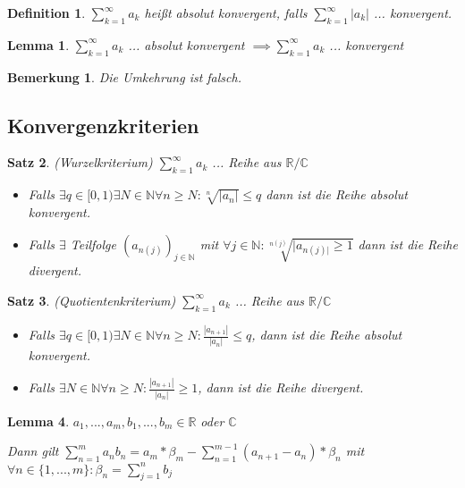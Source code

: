 \documentclass[twocolumn]{article}
\newtheorem{theorem}{Satz}[section]
\newtheorem{lemma}[theorem]{Lemma}
\newtheorem{definition}{Definition}[section]
\newtheorem*{remark}{Bemerkung}
\begin{document}
\begin{definition}
	$\sum_{k=1}^{\infty}a_k$ heißt absolut konvergent, falls $\sum_{k=1}^{\infty}|a_k|$ ... konvergent.
\end{definition}

\begin{lemma}
	$\sum_{k=1}^{\infty}a_k$ ... absolut konvergent $\implies \sum_{k=1}^{\infty}a_k$ ... konvergent
\end{lemma}

\begin{remark}
	Die Umkehrung ist falsch.
\end{remark}

\subsection{Konvergenzkriterien}

\begin{theorem}(Wurzelkriterium)
	$\sum_{k=1}^{\infty}a_k$ ... Reihe aus $\mathbb{R} / \mathbb{C}$
	
	\begin{itemize}
		\item Falls $\exists q \in [0,1) \exists N \in \mathbb{N} \forall n \geq N : \sqrt[n]{|a_n|}\leq q$ dann ist die Reihe absolut konvergent.
		\item Falls $\exists$ Teilfolge $(a_{n(j)})_{j \in \mathbb{N}}$ mit $\forall j \in \mathbb{N} : \sqrt[n(j)]{|a_{n(j)|}\geq 1}$ dann ist die Reihe divergent.
	\end{itemize}
\end{theorem}

\begin{theorem}(Quotientenkriterium)
	$\sum_{k=1}^{\infty}a_k$ ... Reihe aus $\mathbb{R} / \mathbb{C}$
	
	\begin{itemize}
		\item Falls $\exists q \in [0,1) \exists N \in \mathbb{N} \forall n \geq N : \frac{|a_{n+1}|}{|a_n|} \leq q$, dann ist die Reihe absolut konvergent.
		\item Falls $\exists N \in \mathbb{N} \forall n \geq N : \frac{|a_{n+1}|}{|a_n|} \geq 1$, dann ist die Reihe divergent.
	\end{itemize}
\end{theorem}

\begin{lemma}
	$a_1,...,a_m,b_1,...,b_m \in \mathbb{R}$ oder $\mathbb{C}$
	
	Dann gilt $\sum_{n=1}^{m}a_nb_n=a_m*\beta_m-\sum_{n=1}^{m-1}(a_{n+1}-a_n)*\beta_n$ mit $\forall n \in \{1,...,m\}: \beta_n = \sum_{j=1}^{n}b_j$
\end{lemma}
\end{document}
